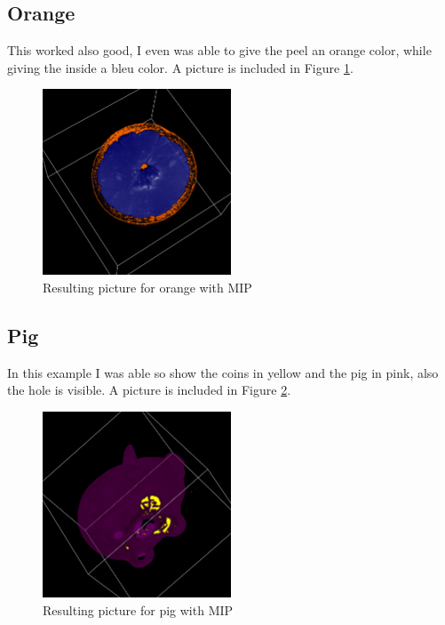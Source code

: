 \documentclass[a4paper,twoside,11pt]{article}
\begin{document}
\subsection{Orange}
This worked also good, I even was able to give the peel an orange color, while giving the inside a bleu color. A picture is included in Figure \ref{MO}.
\begin{figure}[!h]
  \centering
  \includegraphics[width=0.5\textwidth]{MO.png}
  \caption{Resulting picture for orange with MIP}
  \label{MO}
\end{figure}

\subsection{Pig}
In this example I was able so show the coins in yellow and the pig in pink, also the hole is visible. A picture is included in Figure \ref{MP}.
\begin{figure}[!h]
  \centering
  \includegraphics[width=0.5\textwidth]{MP.png}
  \caption{Resulting picture for pig with MIP}
  \label{MP}
\end{figure}
\end{document}
